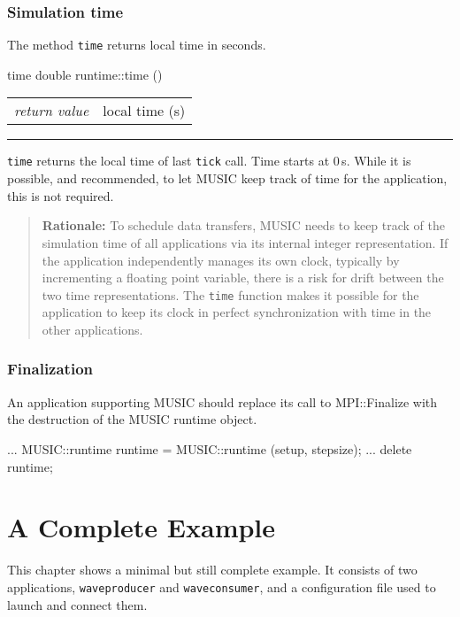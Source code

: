 \documentclass[a4paper]{report}
\makeatletter
\newenvironment{rationale}%
{\par\begin{quote}\textbf{Rationale:}}%
{\par\end{quote}}
\newenvironment{parameters}%
{\begin{tabular}{@{\hspace{2em}}lp{0.6\textwidth}}}%
{\end{tabular}\par\vspace{1mm}\par\hrule\par\vspace{5mm}}
\makeatother
\begin{document}
\subsection{Simulation time}

The method \lstinline|time| returns local time in seconds.

\begin{head}{time}
  double runtime::time ()
\end{head}
\begin{parameters}
  \emph{return value} & local time (s) \\
\end{parameters}

\lstinline|time| returns the local time of last \lstinline|tick|
call.  Time starts at 0\,s.  While it is possible, and recommended, to
let MUSIC keep track of time for the application, this is not
required.

\begin{rationale}
  To schedule data transfers, MUSIC needs to keep track of the
  simulation time of all applications via its internal integer
  representation.  If the application independently manages its own
  clock, typically by incrementing a floating point variable, there is
  a risk for drift between the two time representations.  The
  \lstinline|time| function makes it possible for the application to
  keep its clock in perfect synchronization with time in the other
  applications.
\end{rationale}


\subsection{Finalization}

An application supporting MUSIC should replace its call to
MPI::Finalize with the destruction of the MUSIC runtime object.

\begin{code}{}
  ...
  MUSIC::runtime runtime = MUSIC::runtime (setup, stepsize);
  ...
  delete runtime;
\end{code}

\chapter{A Complete Example}

This chapter shows a minimal but still complete example.  It consists
of two applications, \texttt{waveproducer} and \texttt{waveconsumer},
and a configuration file used to launch and connect them.
\end{document}
